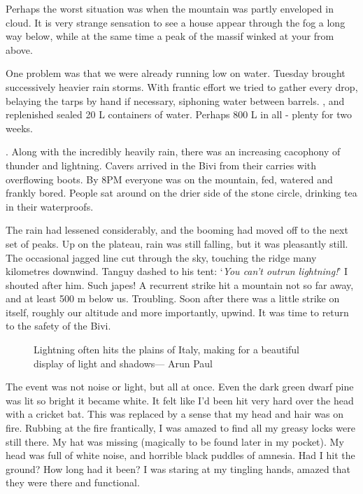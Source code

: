 Perhaps the worst situation was when the mountain was partly enveloped in cloud. It is very strange sensation to see a house appear through the fog a long way below, while at the same time a peak of the  massif winked at your from above. 

One problem was that we were already running low on water. Tuesday brought successively heavier rain storms. With frantic effort we tried to gather every drop, belaying the tarps by hand if necessary, siphoning water between barrels. , and replenished sealed 20 L containers of water. Perhaps 800 L in all - plenty for two weeks. 

. Along with the incredibly heavily rain, there was an increasing cacophony of thunder and lightning. Cavers arrived in the Bivi from their carries with overflowing boots. By 8PM everyone was on the mountain, fed, watered and frankly bored. People sat around on the drier side of the stone circle, drinking tea in their waterproofs. 

The rain had lessened considerably, and the booming had moved off to the next set of peaks. Up on the plateau, rain was still falling, but it was pleasantly still. The occasional jagged line cut through the sky, touching the ridge many kilometres downwind. Tanguy dashed to his tent: `\textit{You can't outrun lightning!}' I shouted after him. Such japes! A recurrent strike hit a mountain not so far away, and at least 500 m below us. Troubling. Soon after there was a little strike on  itself, roughly our altitude and more importantly, upwind. It was time to return to the safety of the Bivi.

\begin{figure}[t!]
\checkoddpage \ifoddpage \forcerectofloat \else \forceversofloat \fi
\centering
{}
\caption{Lightning often hits the plains of Italy, making for a beautiful display of light and shadows--- Arun Paul}
\label{lightning}
\end{figure}


The event was not noise or light, but all at once.  Even the dark green dwarf pine was lit so bright it became white. It felt like I'd been hit very hard over the head with a cricket bat. This was replaced by a sense that my head and hair was on fire. Rubbing at the fire frantically, I was amazed to find all my greasy locks were still there. My hat was missing (magically to be found later in my pocket). My head was full of white noise, and horrible black puddles of amnesia. Had I hit the ground? How long had it been? I was staring at my tingling hands, amazed that they were there and functional. 

